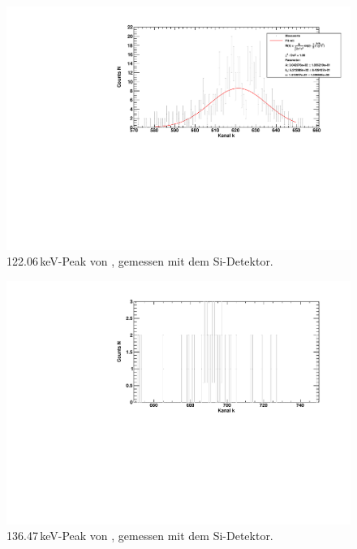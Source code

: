 \begin{figure}[H]
\begin{center}
  \includegraphics[width=\textwidth]{../img/part3/Co-Si_00.pdf}
  \caption{122.06\,keV-Peak von \co, gemessen mit dem Si-Detektor.}
  \label{img:co:si:peak0}
\end{center}
\end{figure}

\begin{figure}[H]
\begin{center}
  \includegraphics[width=\textwidth]{../img/part3/Co-Si_01.pdf}
  \caption{136.47\,keV-Peak von \co, gemessen mit dem Si-Detektor.}
  \label{img:co:si:peak1}
\end{center}
\end{figure}

